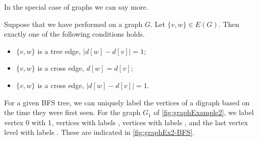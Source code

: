 %
%

In the special case of graphs we can say more.

\begin{Theorem}
\label{thm:BFS-grapharcclass}
Suppose that we have performed  on a graph $G$. 
Let $\{v, w\}\in E(G)$. Then exactly one of the following conditions holds.
\begin{itemize}
	\item $\{v, w\}$ is a tree edge, $| d[w] - d[v] |= 1$;
	\item $\{v, w\}$ is a cross edge, $d[w] = d[v]$;
	\item $\{v, w\}$ is a cross edge, $| d[w] - d[v] | = 1$.
\end{itemize}
\end{Theorem}


For a given BFS tree, we can uniquely label the vertices of a digraph based on the time they were first seen. 
For the graph $G_1$ of \cref{fig:graphExample2}, we label vertex 0 with 1,
vertices  with labels , vertices  with labels , 
and the last vertex level  with labels .  
These are indicated in \cref{fig:graphEx2-BFS}.

